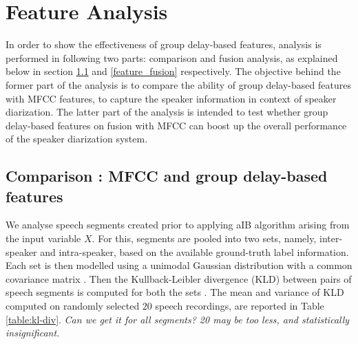 \documentclass[conference]{IEEEtran}
\begin{document}

\section{Feature Analysis}
\label{feature_analysis_and_fusion}
In order to show the effectiveness of group delay-based features, analysis is
performed in following two parts: comparison and fusion analysis, as explained
below in section \ref{feature_analysis} and \ref{feature_fusion} respectively.
The objective behind the former part of the analysis is to compare the ability
of group delay-based features with MFCC features, to capture the speaker
information in context of speaker diarization. The latter part of the
analysis is intended to test whether group delay-based features on fusion with
MFCC can boost up the overall performance of the speaker diarization system. 
 
\subsection{Comparison : MFCC and group delay-based features}
\label{feature_analysis}

We analyse speech segments created prior to applying aIB algorithm arising from
the input variable $X$.  For this, segments are pooled into two sets, 
namely, inter-speaker and intra-speaker, based on the available ground-truth 
label information. Each set is then modelled using a unimodal Gaussian
distribution with a common covariance matrix \cite{featFilterBank}. 
Then the Kullback-Leibler divergence (KLD) between pairs of 
speech segments is computed for both the
sets \cite{kld}. The mean and variance of KLD computed on randomly selected $20$
speech recordings, are reported in Table \ref{table:kl-div}. 
\textit{Can we get it for all segments? 20 may be too less, and statistically
insignificant.}
\end{document}
